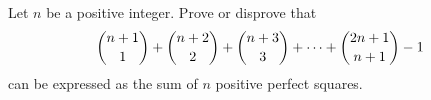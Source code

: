Let $n$ be a positive integer. Prove or disprove that
\[\dbinom{n+1}{1}+\dbinom{n+2}{2}+\dbinom{n+3}{3}+\cdots+\dbinom{2n+1}{n+1}-1\]
can be expressed as the sum of $n$ positive perfect squares.
